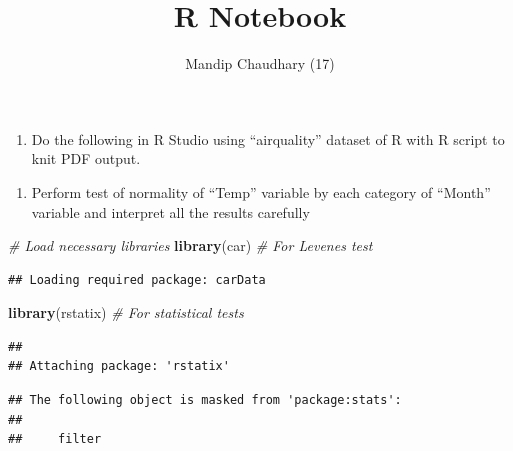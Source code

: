 \documentclass[
]{article}
\title{R Notebook}
\author{Mandip Chaudhary (17)}
\date{}
\newenvironment{Shaded}{\begin{snugshade}}{\end{snugshade}}
\newcommand{\CommentTok}[1]{\textcolor[rgb]{0.56,0.35,0.01}{\textit{#1}}}
\newcommand{\FunctionTok}[1]{\textcolor[rgb]{0.13,0.29,0.53}{\textbf{#1}}}
\newcommand{\NormalTok}[1]{#1}
\providecommand{\tightlist}{%
  \setlength{\itemsep}{0pt}\setlength{\parskip}{0pt}}
\begin{document}
\maketitle

{
\setcounter{tocdepth}{3}
\tableofcontents
}
\begin{enumerate}
\def\labelenumi{\arabic{enumi}.}
\setcounter{enumi}{6}
\tightlist
\item
  Do the following in R Studio using ``airquality'' dataset of R with R
  script to knit PDF output.
\end{enumerate}

\begin{enumerate}
\def\labelenumi{\alph{enumi}.}
\tightlist
\item
  Perform test of normality of ``Temp'' variable by each category of
  ``Month'' variable and interpret all the results carefully
\end{enumerate}

\begin{Shaded}
\begin{Highlighting}[]
\CommentTok{\# Load necessary libraries}
\FunctionTok{library}\NormalTok{(car)  }\CommentTok{\# For Levene\textquotesingle{}s test}
\end{Highlighting}
\end{Shaded}

\begin{verbatim}
## Loading required package: carData
\end{verbatim}

\begin{Shaded}
\begin{Highlighting}[]
\FunctionTok{library}\NormalTok{(rstatix)  }\CommentTok{\# For statistical tests}
\end{Highlighting}
\end{Shaded}

\begin{verbatim}
## 
## Attaching package: 'rstatix'
\end{verbatim}

\begin{verbatim}
## The following object is masked from 'package:stats':
## 
##     filter
\end{verbatim}
\end{document}
